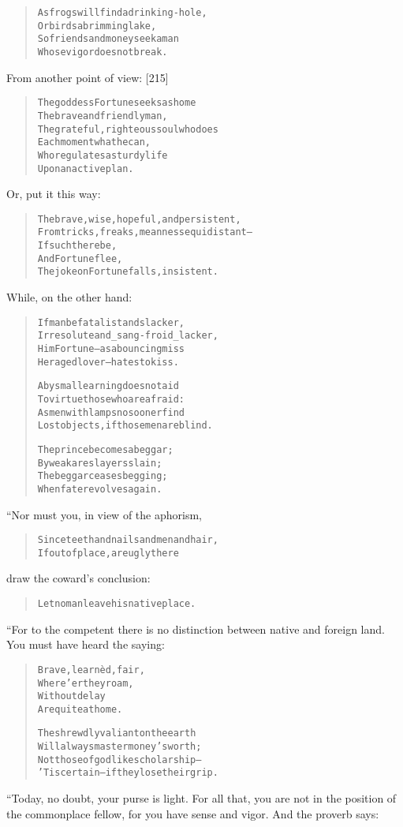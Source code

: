 \documentclass[article, twoside, 14pt]{memoir}
\renewenvironment{verbatim}{%
\begin{quote}%
\vskip -10pt%
\begin{alltt}\normalfont\large}{\end{alltt}%
\end{quote}%
\vskip -10pt
} %
\begin{document}
\begin{verbatim}
As frogs will find a drinking-hole,
    Or birds a brimming lake,
So friends and money seek a man
    Whose vigor does not break.
\end{verbatim}
From another point of view: [215]

\begin{verbatim}
The goddess Fortune seeks as home
    The brave and friendly man,
The grateful, righteous soul who does
    Each moment what he can,
Who regulates a sturdy life
    Upon an active plan.
\end{verbatim}
Or, put it this way:

\begin{verbatim}
The brave, wise, hopeful, and persistent,
From tricks, freaks, meanness equidistant--
    If such there be,
    And Fortune flee,
The joke on Fortune falls, insistent.
\end{verbatim}
While, on the other hand:

\begin{verbatim}
If man be fatalist and slacker,
Irresolute and _sang-froid_ lacker,
Him Fortune--as a bouncing miss
Her aged lover--hates to kiss.

Abysmal learning does not aid
To virtue those who are afraid:
As men with lamps no sooner find
Lost objects, if those men are blind.

The prince becomes a beggar;
    By weak are slayers slain;
The beggar ceases begging;
    When fate revolves again.
\end{verbatim}
“Nor must you, in view of the aphorism,

\begin{verbatim}
Since teeth and nails and men and hair,
If out of place, are ugly there
\end{verbatim}
draw the coward's conclusion:

\begin{verbatim}
Let no man leave his native place.
\end{verbatim}
“For to the competent there is no distinction between native and
foreign land. You must have heard the saying:

\begin{verbatim}
Brave, learnèd, fair,
    Where'er they roam,
Without delay
    Are quite at home.

The shrewdly valiant on the earth
Will always master money's worth;
Not those of godlike scholarship--
'Tis certain--if they lose their grip.
\end{verbatim}
“Today, no doubt, your purse is light. For all that, you are not in
the position of the commonplace fellow, for you have sense and
vigor. And the proverb says:
\end{document}
